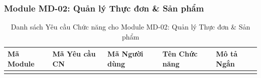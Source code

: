 \subsubsection{Module MD-02: Quản lý Thực đơn \& Sản phẩm}
\begin{longtable}{|m{2cm}|m{2.5cm}|m{2cm}|m{4cm}|m{4.5cm}|}
\caption{Danh sách Yêu cầu Chức năng cho Module MD-02: Quản lý Thực đơn \& Sản phẩm} \label{tab:fr_md02} \\
\hline
\textbf{Mã Module} & \textbf{Mã Yêu cầu CN} & \textbf{Mã Người dùng} & \textbf{Tên Chức năng} & \textbf{Mô tả Ngắn} \\
\hline
\endhead %

\hline
\endfoot %

\hline
\endlastfoot %


\end{longtable}
